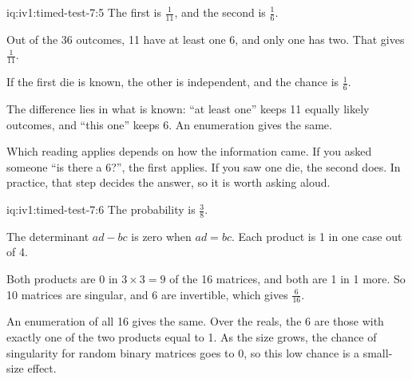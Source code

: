 \begin{solution}{iq:iv1:timed-test-7:5}
The first is $\frac{1}{11}$, and the second is $\frac16$.

Out of the 36 outcomes, 11 have at least one 6, and only one has two. That gives $\frac{1}{11}$.

If the first die is known, the other is independent, and the chance is $\frac16$.

The difference lies in what is known: ``at least one'' keeps 11 equally likely outcomes, and ``this one'' keeps 6. An enumeration gives the same.

Which reading applies depends on how the information came. If you asked someone ``is there a 6?'', the first applies. If you saw one die, the second does. In practice, that step decides the answer, so it is worth asking aloud.

\end{solution}

\begin{solution}{iq:iv1:timed-test-7:6}
The probability is $\frac38$.

The determinant $ad - bc$ is zero when $ad = bc$. Each product is 1 in one case out of 4.

Both products are 0 in $3 \times 3 = 9$ of the 16 matrices, and both are 1 in 1 more. So 10 matrices are singular, and 6 are invertible, which gives $\frac{6}{16}$.

An enumeration of all 16 gives the same. Over the reals, the 6 are those with exactly one of the two products equal to 1. As the size grows, the chance of singularity for random binary matrices goes to 0, so this low chance is a small-size effect.

\end{solution}

